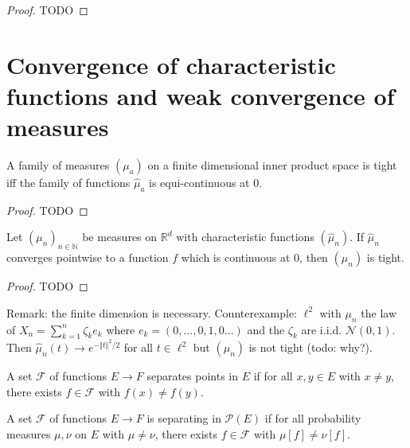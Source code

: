 \begin{proof}
TODO
\end{proof}

\section{Convergence of characteristic functions and weak convergence of measures}

\begin{lemma}\label{lem:tight_iff_charFun_equiContinuous}
A family of measures $(\mu_a)$ on a finite dimensional inner product space is tight iff the family of functions $\hat{\mu}_a$ is equi-continuous at 0.
\end{lemma}

\begin{proof}
TODO
\end{proof}

\begin{lemma}\label{lem:tight_of_tendsto_charFun}
Let $(\mu_n)_{n \in \mathbb{N}}$ be measures on $\mathbb{R}^d$ with characteristic functions $(\hat{\mu}_n)$. If $\hat{\mu}_n$ converges pointwise to a function $f$ which is continuous at 0, then $(\mu_n)$ is tight.
\end{lemma}

\begin{proof}
TODO
\end{proof}

Remark: the finite dimension is necessary. Counterexample: $\ell^2$ with $\mu_n$ the law of $X_n = \sum_{k=1}^n \zeta_k e_k$ where $e_k = (0, \ldots, 0, 1, 0 \ldots)$ and the $\zeta_k$ are i.i.d. $\mathcal N(0,1)$. Then $\hat{\mu}_n(t) \to e^{- \Vert t \Vert^2 / 2}$ for all $t \in \ell^2$ but $(\mu_n)$ is not tight (todo: why?).

\begin{definition}\label{def:separates_points}
 \leanok
A set $\mathcal F$ of functions $E \to F$ separates points in $E$ if for all $x, y \in E$ with $x \ne y$, there exists $f \in \mathcal F$ with $f(x) \ne f(y)$.
\end{definition}

\begin{definition}\label{def:separating}
A set $\mathcal F$ of functions $E \to F$ is separating in $\mathcal P(E)$ if for all probability measures $\mu, \nu$ on $E$ with $\mu \ne \nu$, there exists $f \in \mathcal F$ with $\mu[f] \ne \nu[f]$.
\end{definition}

